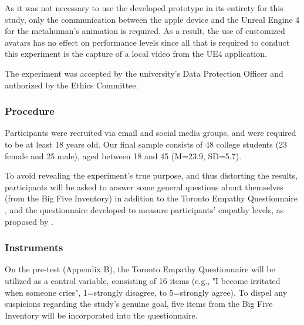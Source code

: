 As it was not necessary to use the developed prototype in its entirety for this study, only the communication between the apple device and the Unreal Engine 4 for the metahuman's animation is required. As a result, the use of customized avatars has no effect on performance levels since all that is required to conduct this experiment is the capture of a local video from the UE4 application.

The experiment was accepted by the university's Data Protection Officer and authorized by the Ethics Committee.

\subsubsection{Procedure}


Participants were recruited via email and social media groups, and were required to be at least 18 years old. Our final sample consists of 48 college students (23 female and 25 male), aged between 18 and 45 (M=23.9, SD=5.7). 



To avoid revealing the experiment's true purpose, and thus distorting the results, participants will be asked to answer some general questions about themselves (from the Big Five Inventory) in addition to the Toronto Empathy Questionnaire \cite{SPR03}, and the questionnaire developed to measure participants' empathy levels, as proposed by \cite{ROT19, ZIB19}. 


\subsubsection{Instruments}
On the pre-test (Appendix B), the Toronto Empathy Questionnaire \cite{SPR03} will be utilized as a control variable, consisting of 16 items (e.g., "I become irritated when someone cries", 1=strongly disagree, to 5=strongly agree). To dispel any suspicions regarding the study's genuine goal, five items from the Big Five Inventory \cite{JOH91} will be incorporated into the questionnaire.

